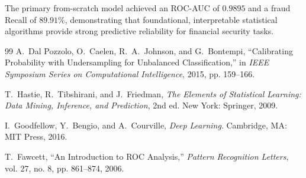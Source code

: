 \documentclass[11pt,a4paper]{article}
\begin{document}
The primary from-scratch model achieved an ROC-AUC of $0.9895$ and a fraud Recall of $89.91\%$, demonstrating that foundational, interpretable statistical algorithms provide strong predictive reliability for financial security tasks.

\begin{thebibliography}{99}
A.~Dal Pozzolo, O.~Caelen, R.~A.~Johnson, and G.~Bontempi, ``Calibrating Probability with Undersampling for Unbalanced Classification,'' in \emph{IEEE Symposium Series on Computational Intelligence}, 2015, pp. 159--166.

T.~Hastie, R.~Tibshirani, and J.~Friedman, \emph{The Elements of Statistical Learning: Data Mining, Inference, and Prediction}, 2nd ed. New York: Springer, 2009.

I.~Goodfellow, Y.~Bengio, and A.~Courville, \emph{Deep Learning}. Cambridge, MA: MIT Press, 2016.

T.~Fawcett, ``An Introduction to ROC Analysis,'' \emph{Pattern Recognition Letters}, vol. 27, no. 8, pp. 861--874, 2006.
\end{thebibliography}
\end{document}

